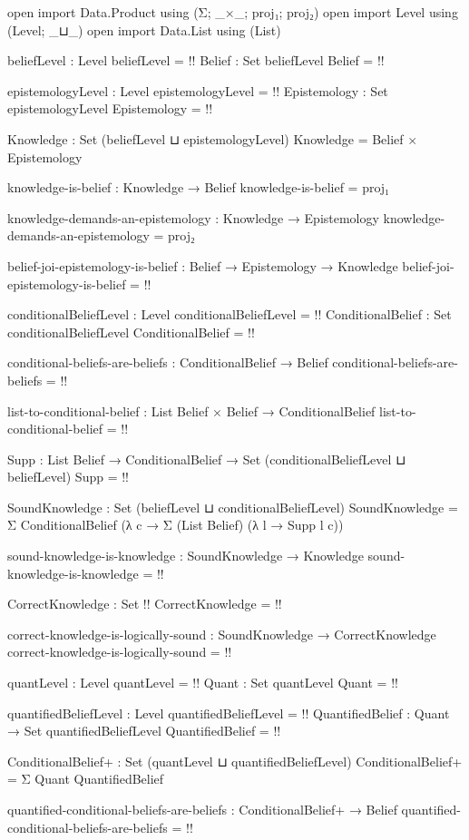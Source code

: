 \begin{code}
open import Data.Product using (Σ; _×_; proj₁; proj₂)
open import Level using (Level; _⊔_)
open import Data.List using (List)

beliefLevel : Level
beliefLevel = {!!}
Belief : Set beliefLevel
Belief = {!!}

epistemologyLevel : Level
epistemologyLevel = {!!}
Epistemology : Set epistemologyLevel
Epistemology = {!!}

Knowledge : Set (beliefLevel ⊔ epistemologyLevel)
Knowledge = Belief × Epistemology

knowledge-is-belief : Knowledge → Belief
knowledge-is-belief = proj₁

knowledge-demands-an-epistemology : Knowledge → Epistemology
knowledge-demands-an-epistemology = proj₂

belief-joi-epistemology-is-belief : Belief → Epistemology → Knowledge
belief-joi-epistemology-is-belief = {!!}

conditionalBeliefLevel : Level
conditionalBeliefLevel = {!!}
ConditionalBelief : Set conditionalBeliefLevel
ConditionalBelief = {!!}

conditional-beliefs-are-beliefs : ConditionalBelief → Belief
conditional-beliefs-are-beliefs = {!!}

list-to-conditional-belief : List Belief × Belief → ConditionalBelief
list-to-conditional-belief = {!!}

Supp : List Belief → ConditionalBelief → Set (conditionalBeliefLevel ⊔ beliefLevel)
Supp = {!!}

SoundKnowledge : Set (beliefLevel ⊔ conditionalBeliefLevel)
SoundKnowledge = Σ ConditionalBelief (λ c → Σ (List Belief) (λ l → Supp l c))

sound-knowledge-is-knowledge : SoundKnowledge → Knowledge
sound-knowledge-is-knowledge = {!!}

CorrectKnowledge : Set {!!}
CorrectKnowledge = {!!}

correct-knowledge-is-logically-sound : SoundKnowledge → CorrectKnowledge
correct-knowledge-is-logically-sound = {!!}

quantLevel : Level
quantLevel = {!!}
Quant : Set quantLevel
Quant = {!!}

quantifiedBeliefLevel : Level
quantifiedBeliefLevel = {!!}
QuantifiedBelief : Quant → Set quantifiedBeliefLevel
QuantifiedBelief = {!!}

ConditionalBelief+ : Set (quantLevel ⊔ quantifiedBeliefLevel)
ConditionalBelief+ = Σ Quant QuantifiedBelief

quantified-conditional-beliefs-are-beliefs : ConditionalBelief+ → Belief
quantified-conditional-beliefs-are-beliefs = {!!}
\end{code}
